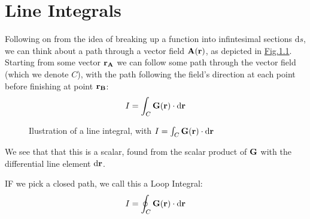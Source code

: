 \documentclass[letterpaper,10pt,english]{jupyterBook}
\begin{document}
\chapter{Line Integrals}
\label{\detokenize{VectorCalculus/lineintegrals:line-integrals}}\label{\detokenize{VectorCalculus/lineintegrals::doc}}
\sphinxAtStartPar
Following on from the idea of breaking up a function into infintesimal sections \(\mathrm{d} s\), we can think about a path through a vector field \(\bf A(r)\), as depicted
in \hyperref[\detokenize{VectorCalculus/lineintegrals:lineintegral}]{Fig.\@ \ref{\detokenize{VectorCalculus/lineintegrals:lineintegral}}}.  Starting from some vector \(\bf r_A\) we can follow some path through the vector field (which we denote \(C\)), with the path following the
field’s direction at each point before finishing at point \(\bf r_B\):
\begin{equation*}
\begin{split}I = \int_C {\bf G(r)} \cdot \mathrm{d}{\bf r}\end{split}
\end{equation*}
\begin{figure}[htbp]
\centering
\capstart

\noindent{}
\caption{Ilustration of a line integral, with \(I = \int_C {\bf G(r)}\cdot \mathrm{d}{\bf r}\)}\label{\detokenize{VectorCalculus/lineintegrals:lineintegral}}\end{figure}

\sphinxAtStartPar
We see that that this is a scalar, found from the scalar product of \(\bf G\) with the differential line element \(\mathrm{d}{\bf r}\).

\sphinxAtStartPar
IF we pick a closed path, we call this a Loop Integral:
\begin{equation*}
\begin{split}I = \oint_C {\bf G(r)} \cdot \mathrm{d}{\bf r}\end{split}
\end{equation*}
\end{document}
